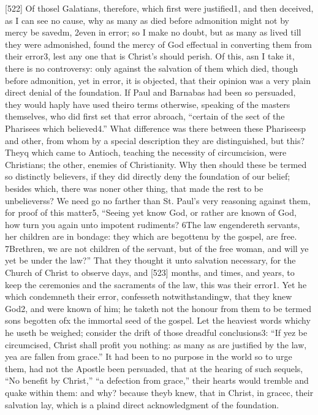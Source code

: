 [522]
Of thosel Galatians, therefore, which first were justified1, and then deceived, as I can see no cause, why as many as died before admonition might not by mercy be savedm, 2even in error; so I make no doubt, but as many as lived till they were admonished, found the mercy of God effectual in converting them from their error3, lest any one that is Christ’s should perish. Of this, asn I take it, there is no controversy: only against the salvation of them which died, though before admonition, yet in error, it is objected, that their opinion was a very plain direct denial of the foundation. If Paul and Barnabas had been so persuaded, they would haply have used theiro terms otherwise, speaking of the masters themselves, who did first set that error abroach, “certain of the sect of the Pharisees which believed4.” What difference was there between these Phariseesp and other, from whom by a special description they are distinguished, but this? Theyq which came to Antioch, teaching the necessity of circumcision, were Christians; the other, enemies of Christianity. Why then should these be termed so distinctly believers, if they did directly deny the foundation of our belief; besides which, there was noner other thing, that made the rest to be unbelieverss? We need go no farther than St. Paul’s very reasoning against them, for proof of this matter5, “Seeing yet know God, or rather are known of God, how turn you again unto impotent rudiments? 6The law engendereth servants, her children are in bondage: they which are begottenu by the gospel, are free. 7Brethren, we are not children of the servant, but of the free woman, and will ye yet be under the law?” That they thought it unto salvation necessary, for the Church of Christ to observe days, and [523] months, and times, and years, to keep the ceremonies and the sacraments of the law, this was their error1. Yet he which condemneth their error, confesseth notwithstandingw, that they knew God2, and were known of him; he taketh not the honour from them to be termed sons begotten ofx the immortal seed of the gospel. Let the heaviest words whichy he useth be weighed; consider the drift of those dreadful conclusions3: “If yez be circumcised, Christ shall profit you nothing: as many as are justified by the law, yea are fallen from grace.” It had been to no purpose in the world so to urge them, had not the Apostle been persuaded, that at the hearing of such sequels, “No benefit by Christ,” “a defection from grace,” their hearts would tremble and quake within them: and why? because theyb knew, that in Christ, in gracec, their salvation lay, which is a plaind direct acknowledgment of the foundation.

